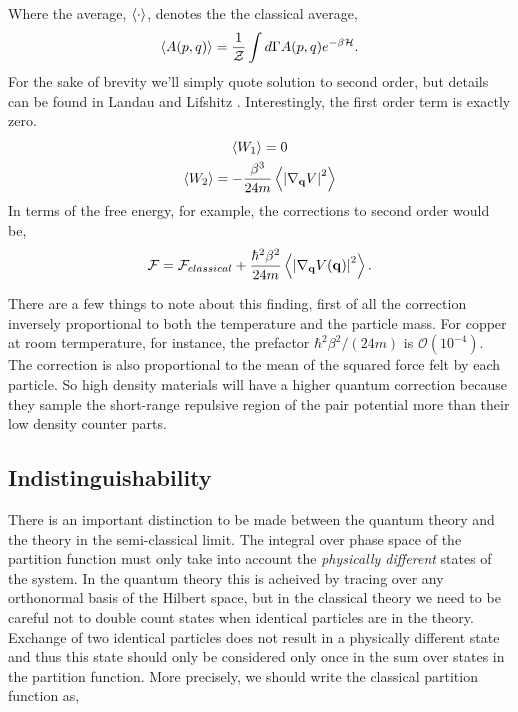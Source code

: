 Where the average, $\left\langle \cdot \right\rangle$, denotes the the classical average, 
\begin{equation}
    \langle A(p, q) \rangle = \frac{1}{\mathcal{Z}} 
        \int d\Gamma A(p, q) e^{-\beta \mathcal{H}}.
\end{equation}
For the sake of brevity we'll simply quote solution to second order, but details can be found in Landau and Lifshitz \cite{LANDAU198079}.
Interestingly, the first order term is exactly zero.
\begin{gather}
    \left\langle W_1 \right\rangle= 0 \\
    \left\langle W_2 \right\rangle = - \frac{\beta^3}{24 m} \left\langle \left\vert \nabla_{\mathbf{q}} V \right\vert^2 \right\rangle 
\end{gather}
In terms of the free energy, for example, the corrections to second order would be, 
\begin{equation}{\label{quantumcorr}}
    \mathcal{F} = \mathcal{F}_{classical} + \frac{\hbar^2\beta^2}{24m}
        \left\langle  \left\vert \nabla_{\mathbf{q}} V(\mathbf{q}) \right\vert^2  \right\rangle.
\end{equation}

There are a few things to note about this finding, first of all the correction inversely proportional to both the temperature and the particle mass.
For copper at room termperature, for instance, the prefactor $\hbar^2\beta^2/(24 m)$ is $\mathcal{O}(10^{-4})$. 
The correction is also proportional to the mean of the squared force felt by each particle. So high density materials will have a higher quantum correction because they sample the short-range repulsive region of the pair potential more than their low density counter parts.


\subsection{Indistinguishability} %

There is an important distinction to be made between the quantum theory and the theory in the semi-classical limit.
The integral over phase space of the partition function must only take into account the \textit{physically different} states of the system.  
In the quantum theory this is acheived by tracing over any orthonormal basis of the Hilbert space, but in the classical theory we need to be careful not to double count states when identical particles are in the theory.
Exchange of two identical particles does not result in a physically different state and thus this state should only be considered only once in the sum over states in the partition function.
More precisely, we should write the classical partition function as,

